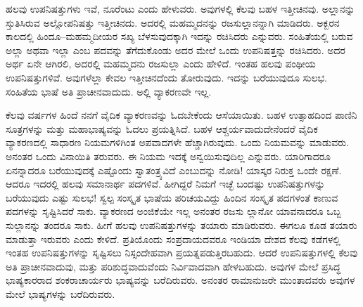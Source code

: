 ಹಲವು ಉಪನಿಷತ್ತುಗಳು ಇವೆ, ನೂರೆಂಟು ಎಂದು ಹೇಳುವರು. ಅವುಗಳಲ್ಲಿ ಕೆಲವು ಬಹಳ ಇತ್ತೀಚಿನವು. ಅಲ್ಲಾನನ್ನು ಸ್ತುತಿಸಿರುವ ಅಲ್ಲೋಪನಿಷತ್ತು ಇತ್ತೀಚಿನದು. ಅದರಲ್ಲಿ ಮಹಮ್ಮದನನ್ನು ರಜಸುಲ್ಲಾನನ್ನಾಗಿ ಮಾಡಿದರು. ಅಕ್ಬರನ ಕಾಲದಲ್ಲಿ ಹಿಂದೂ–ಮಹಮ್ಮದೀಯರ ಸಖ್ಯ ಬೆಳಸುವುದಕ್ಕಾಗಿ ಇದನ್ನು ರಚಿಸಿದರು ಎನ್ನುವರು. ಸಂಹಿತೆಯಲ್ಲಿ ಬರುವ ಅಲ್ಲಾ ಅಥವಾ ಇಲ್ಲಾ ಎಂಬ ಪದವನ್ನು ತೆಗೆದುಕೊಂಡು ಅದರ ಮೇಲೆ ಒಂದು ಉಪನಿಷತ್ತನ್ನು ರಚಿಸಿದರು. ಅದರ ಅರ್ಥ ಏನೇ ಆಗಿರಲಿ, ಅದರಲ್ಲಿ ಮಹಮ್ಮದನು ರಜಸುಲ್ಲಾ ಎಂದು ಹೇಳಿದೆ. ಇಂತಹ ಹಲವು ಪಂಥೀಯ ಉಪನಿಷತ್ತುಗಳಿವೆ. ಅವುಗಳೆಲ್ಲಾ ಕೇವಲ ಇತ್ತೀಚಿನದೆಂದು ತೋರುವುದು. ಇದನ್ನು ಬರೆಯುವುದೂ ಸುಲಭ. ಸಂಹಿತೆಯ ಭಾಷೆ ಅತಿ ಪ್ರಾಚೀನವಾದುದು. ಅಲ್ಲಿ ವ್ಯಾಕರಣವೇ ಇಲ್ಲ.

ಕೆಲವು ವರ್ಷಗಳ ಹಿಂದೆ ನನಗೆ ವೈದಿಕ ವ್ಯಾಕರಣವನ್ನು ಓದಬೇಕೆಂದು ಆಸೆಯಾಯಿತು. ಬಹಳ ಉತ್ಸಾಹದಿಂದ ಪಾಣಿನಿ ಸೂತ್ರಗಳನ್ನು ಮತ್ತು ಮಹಾಭಾಷ್ಯವನ್ನು ಓದಲು ಪ್ರಯತ್ನಿಸಿದೆ. ಬಹಳ ಆಶ್ಚರ್ಯವಾದುದೇನೆಂದರೆ ವೈದಿಕ ವ್ಯಾಕರಣದಲ್ಲಿ ಸಾಧಾರಣ ನಿಯಮಗಳಿಗಿಂತ ಅಪವಾದಗಳೇ ಹೆಚ್ಚಾಗಿರುವುದು. ಒಂದು ನಿಯಮವನ್ನು ಮಾಡುವರು. ಅನಂತರ ಒಂದು ವಿನಾಯಿತಿ ತರುವರು. ಈ ನಿಯಮ ಇದಕ್ಕೆ ಅನ್ವಯಿಸುವುದಿಲ್ಲ ಎನ್ನುವರು. ಯಾರಿಗಾದರೂ ಏನನ್ನಾದರೂ ಬರೆಯುವುದಕ್ಕೆ ಎಷ್ಟೊಂದು ಸ್ವಾತಂತ್ರ್ಯವಿದೆ ಎಂಬುದನ್ನು ನೋಡಿ! ಯಾಸ್ಕರ ನಿರುಕ್ತ ಒಂದೇ ರಕ್ಷಣೆ. ಆದರೂ ಇದರಲ್ಲಿ ಹಲವು ಸಮಾನಾರ್ಥ ಪದಗಳಿವೆ. ಹೀಗಿದ್ದರೆ ನಿಮಗೆ ಇಚ್ಛೆ ಬಂದಷ್ಟು ಉಪನಿಷತ್ತುಗಳನ್ನು ಬರೆಯುವುದು ಎಷ್ಟು ಸುಲಭ! ಸ್ವಲ್ಪ ಸಂಸ್ಕೃತ ಭಾಷೆಯ ಪರಿಚಯವಿದ್ದು ಹಿಂದಿನ ಸಂಸ್ಕೃತ ಪದಗಳಂತೆ ಕಾಣುವ ಪದಗಳನ್ನು ಸೃಷ್ಟಿಸಿದರೆ ಸಾಕು. ವ್ಯಾಕರಣದ ಅಂಜಿಕೆಯೇ ಇಲ್ಲ ಅನಂತರ ರಜಸು ಲ್ಲಾನೋ ಯಾವನಾದರೂ ಒಬ್ಬ ಸುಲ್ಲಾನನ್ನು ತಂದರೂ ಸಾಕು. ಹೀಗೆ ಹಲವು ಉಪನಿಷತ್ತುಗಳನ್ನು ತಯಾರು ಮಾಡಿರುವರು. ಈಗಲೂ ಕೂಡ ತಯಾರು ಮಾಡುತ್ತಾ ಇರುವರು ಎಂದು ಕೇಳಿದೆ. ಪ್ರತಿಯೊಂದು ಸಂಪ್ರದಾಯದವರೂ ಇಂಡಿಯಾ ದೇಶದ ಕೆಲವು ಕಡೆಗಳಲ್ಲಿ ಇಂತಹ ಉಪನಿಷತ್ತುಗಳನ್ನು ಸೃಷ್ಟಿಸಲು ನಿಸ್ಸಂದೇಹವಾಗಿ ಪ್ರಯತ್ನಪಡುತ್ತಿರಬಹುದು. ಆದರೆ ಉಪನಿಷತ್ತುಗಳಲ್ಲಿ ಕೆಲವು ಅತಿ ಪ್ರಾಚೀನವಾದುವು, ಮತ್ತು ಪರಿಶುದ್ಧವಾದುವೆಂದು ನಿರ್ವಿವಾದವಾಗಿ ಹೇಳಬಹುದು. ಅವುಗಳ ಮೇಲೆ ಪ್ರಸಿದ್ಧ ಭಾಷ್ಯಕಾರರಾದ ಶಂಕರಾಚಾರ್ಯರು ಭಾಷ್ಯವನ್ನು ಬರೆದಿರುವರು. ಅನಂತರ ರಾಮಾನುಜರೇ ಮುಂತಾದವರು ಅವುಗಳ ಮೇಲೆ ಭಾಷ್ಯಗಳನ್ನು ಬರೆದಿರುವರು.

